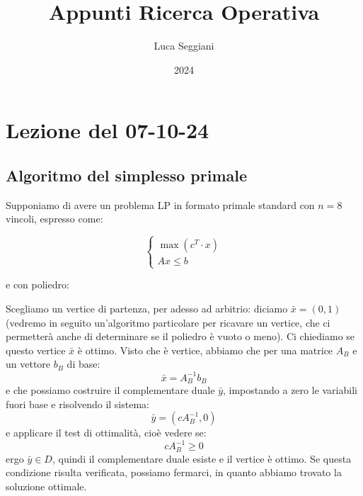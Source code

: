 \documentclass[a4paper,11pt]{article}
\title{Appunti Ricerca Operativa}
\author{Luca Seggiani}
\date{2024}
\begin{document}
\section{Lezione del 07-10-24}

\thispagestyle{empty}
\pagestyle{fancy}

\subsection{Algoritmo del simplesso primale}
Supponiamo di avere un problema LP in formato primale standard con $n = 8$ vincoli, espresso come:

\[
	\begin{cases}
		\max(c^T \cdot x) \\
		Ax \leq b
	\end{cases}
\]

e con poliedro:

\begin{center}
\end{center}

Scegliamo un vertice di partenza, per adesso ad arbitrio: diciamo $\bar{x} = (0, 1)$ (vedremo in seguito un'algoritmo particolare per ricavare un vertice, che ci permetterà anche di determinare se il poliedro è vuoto o meno).
Ci chiediamo se questo vertice $\bar{x}$ è ottimo.
Visto che è vertice, abbiamo che per una matrice $A_B$ e un vettore $b_B$ di base:
$$
\bar{x} = A_B^{-1} b_B
$$
e che possiamo costruire il complementare duale $\bar{y}$, impostando a zero le variabili fuori base e risolvendo il sistema:
$$
\bar{y} = (cA_B^{-1}, 0)
$$
e applicare il test di ottimalità, cioè vedere se:
$$
cA_B^{-1} \geq 0
$$
ergo $\bar{y} \in D$, quindi il complementare duale esiste e il vertice è ottimo.
Se questa condizione risulta verificata, possiamo fermarci, in quanto abbiamo trovato la soluzione ottimale.
\end{document}
